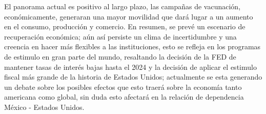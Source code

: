 El panorama actual es positivo al largo plazo, las campañas de vacunación, económicamente, generaran una mayor movilidad que dará lugar a un aumento en el consumo, producción y comercio. En resumen, se prevé un escenario de recuperación económica; aún así persiste un clima de incertidumbre y una creencia en hacer más flexibles a las instituciones, esto se refleja en los programas de estimulo en gran parte del mundo, resaltando la decisión de la FED de mantener tasas de interés bajas hasta el 2024 y la decisión de aplicar el estimulo fiscal más grande de la historia de Estados Unidos; actualmente se esta generando un debate sobre los posibles efectos que esto traerá sobre la economía tanto americana como global, sin duda esto afectará en la relación de dependencia México - Estados Unidos.

\cite{Banxico4toTrismestre}
